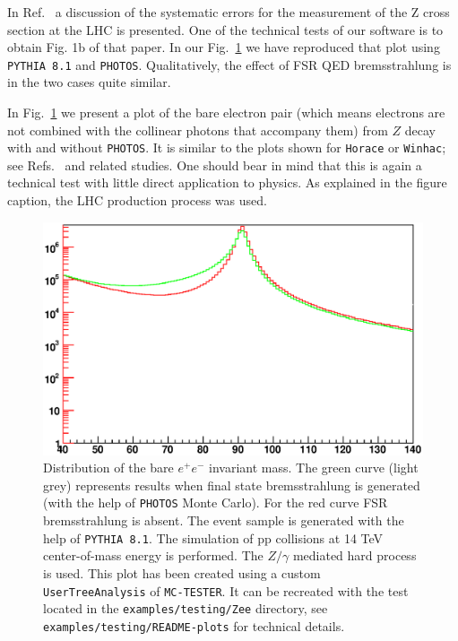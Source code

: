 \documentclass[]{Photos_interface_design}
\begin{document}
In Ref.~\cite{Adam:2008ge} a discussion of the systematic errors for the measurement of the Z cross 
section at the LHC is presented. One of the technical tests of our software is to obtain
Fig. 1b of that paper. In our Fig.~\ref{fig:lineshape} we have 
reproduced that plot using {\tt PYTHIA 8.1} and {\tt PHOTOS}. Qualitatively, the effect
of FSR QED bremsstrahlung is in the two cases quite similar. 


In  Fig.~\ref{fig:lineshape} we present a plot of the bare electron pair 
(which means electrons are not combined with the collinear photons that accompany them) from $Z$
 decay with and without {\tt PHOTOS}. It is similar to
the plots shown for {\tt Horace} or {\tt Winhac}; see Refs.~\cite{CarloniCalame:2003ux,Winhac} and related
studies.
One should bear in mind that this is again a technical test with little 
direct application to physics. As explained in the figure caption, the LHC production process was used.
\begin{figure}[h!]
\centering
\includegraphics[scale=0.85]{lineshape.eps}
\caption{Distribution of the bare $e^+e^-$ invariant mass. The green curve 
(light grey) represents results when final state 
bremsstrahlung is generated (with the help of {\tt PHOTOS} Monte Carlo). For the red curve FSR 
bremsstrahlung is absent. The event sample is generated with the help of {\tt PYTHIA 8.1}.
The simulation of pp collisions at 14 TeV center-of-mass energy is performed.
The $Z/\gamma$ mediated hard process is used.
This plot has been created using a custom {\tt UserTreeAnalysis} of {\tt MC-TESTER}.
It can be recreated with the test located in the {\tt examples/testing/Zee} directory, see  {\tt examples/testing/README-plots} for technical details.
\label{fig:lineshape}
}
\end{figure}
\end{document}
